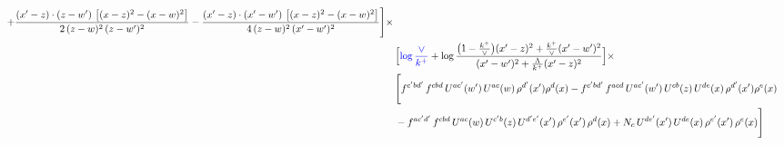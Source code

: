 \documentclass[9pt]{article}
\numberwithin{equation}{section}
\begin{document}
\begin{align}
+\frac{(x'-z)\cdot (z-w')\, \left[(x-z)^{2}-(x-w)^{2}\right]}{2\, (z-w)^{2}\, (z-w')^{2}}-\frac{(x'-z)\cdot (x'-w')\, \left[(x-z)^{2}-(x-w)^{2}\right]}{4\, (z-w)^{2}\,(x'-w')^{2}}\Bigg]\times\,\notag \\ & \Big[{\color{blue}\log\frac{\vee}{k^{+}}}+\log\frac{\big(1-\frac{k^{+}}{\vee}\big)(x'-z)^{2}+\frac{k^{+}}{\vee}(x'-w')^{2}}{(x'-w')^{2}+\frac{\Lambda}{k^{+}}(x'-z)^{2}}\Big]\times\notag \\ & \Bigg[f^{c'bd'}\,f^{cbd}\, U^{ac'}(w')\,U^{ac}(w)\,\rho^{d'}(x')\rho^{d}(x)- f^{c'bd'}\,f^{acd}\,U^{ac'}(w')\,U^{cb}(z)\,U^{de}(x)\,\rho^{d'}(x')\rho^{e}(x) \notag \\ & -f^{ac'd'}\,f^{cbd}\,U^{ac}(w)\,U^{c'b}(z)\,U^{d'e'}(x')\,\rho^{e'}(x')\,\rho^{d}(x) +N_{c}\,U^{de'}(x')\,U^{de}(x)\,\rho^{e'}(x')\,\rho^{e}(x)\Bigg]
\end{align}
\end{document}
